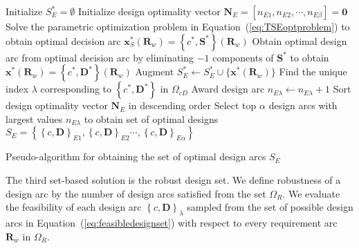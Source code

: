 \begin{algorithm}
	\DontPrintSemicolon %
	Initialize $S_{E}^* = \emptyset$\;	
	Initialize design optimality vector $\mathbf{N}_E = \left[n_{E1},n_{E2},\cdots,n_{E\beta}\right] = \mathbf{0}$\;	
	 {
		Solve the parametric optimization problem in Equation~(\ref{eq:TSEoptproblem}) to obtain optimal decision arc $\mathbf{x}_S^*(\mathbf{R}_w) = \left\{c^*,\mathbf{S}^*\right\}(\mathbf{R}_w)$\;
		Obtain optimal design arc from optimal decision arc by eliminating $-1$ components of $\mathbf{S}^*$ to obtain $\mathbf{x}^*(\mathbf{R}_w) = \left\{c^*,\mathbf{D}^*\right\}(\mathbf{R}_w)$\;
		Augment $S_{E}^* \gets S_{E}^* \cup \{ \mathbf{x}^*(\mathbf{R}_w) \} $\;
		Find the unique index $\lambda$ corresponding to $\left\{c^*,\mathbf{D}^*\right\}$ in $\Omega_{cD}$\;
		Award design arc $n_{E\lambda} \gets n_{E\lambda} + 1$\;
	}
	Sort design optimality vector $\mathbf{N}_E$ in descending order\;
	Select top $\alpha$ design arcs with largest values $n_{E\lambda}$ to obtain set of optimal designs $S_E = \left\{\left\{c,\mathbf{D}\right\}_{E1},\left\{c,\mathbf{D}\right\}_{E2}\cdots,\left\{c,\mathbf{D}\right\}_{E\alpha}\right\}$\;
	\caption{Pseudo-algorithm for obtaining the set of optimal design arcs $S_{E}$}
	\label{algo:SBDOptalgo}
\end{algorithm}

The third set-based solution is the robust design set. We define robustness of a design arc by the number of design arcs satisfied from the set $\Omega_R$. We evaluate the feasibility of each design arc $\left\{c,\mathbf{D}\right\}_\lambda$ sampled from the set of possible design arcs in Equation~(\ref{eq:feasibledesignset}) with respect to every requirement arc $\mathbf{R}_w$ in $\Omega_R$.

